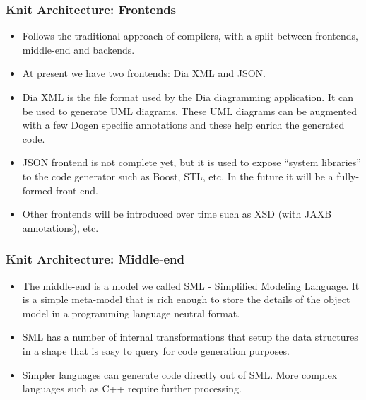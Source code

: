 \documentclass{beamer}
\begin{document}
\begin{frame}
\frametitle{Knit Architecture: Frontends}

\begin{itemize}

\item Follows the traditional approach of compilers, with a split
  between frontends, middle-end and backends.

\pause

\item At present we have two frontends: Dia XML and JSON.

\pause

\item Dia XML is the file format used by the Dia diagramming
  application. It can be used to generate UML diagrams. These UML
  diagrams can be augmented with a few Dogen specific annotations and
  these help enrich the generated code.

\pause

\item JSON frontend is not complete yet, but it is used to expose
  ``system libraries'' to the code generator such as Boost, STL,
  etc. In the future it will be a fully-formed front-end.

\pause

\item Other frontends will be introduced over time such as XSD (with
  JAXB annotations), etc.

\end{itemize}

\end{frame}

\begin{frame}
\frametitle{Knit Architecture: Middle-end}

\begin{itemize}

\item The middle-end is a model we called SML - Simplified Modeling
  Language. It is a simple meta-model that is rich enough to store the
  details of the object model in a programming language neutral
  format.

\pause

\item SML has a number of internal transformations that setup the data
  structures in a shape that is easy to query for code generation
  purposes.

\pause

\item Simpler languages can generate code directly out of SML. More
  complex languages such as C++ require further processing.

\end{itemize}

\end{frame}
\end{document}
